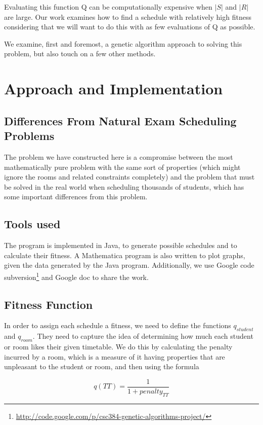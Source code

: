 \documentclass[letterpaper]{article}
\begin{document}
  Evaluating this function Q can be computationally expensive when $|S|$ and $|R|$
  are large. Our work examines how to find a schedule with relatively high fitness
  considering that we will want to do this with as few evaluations of Q as possible.

  We examine, first and foremost, a genetic algorithm approach to solving this problem,
  but also touch on a few other methods.

\section{Approach and Implementation}
  \subsection{Differences From Natural Exam Scheduling Problems}
    The problem we have constructed here is a compromise between the most
    mathematically pure problem with the same sort of properties (which might ignore the
    rooms and related constraints completely) and the problem that must be solved in the
    real world when scheduling thousands of students, which has some important differences
    from this problem.
    
  \subsection{Tools used}
    The program is implemented in Java, to generate possible schedules and to calculate
    their fitness. A Mathematica program is also written to plot graphs, given the data
    generated by the Java program. Additionally, we use Google code 
    subversion\footnote{\url{http://code.google.com/p/csc384-genetic-algorithms-project/}}
    and Google doc to share the work.
    
  \subsection{Fitness Function}
    In order to assign each schedule a fitness, we need to define the functions 
    $q_{student}$ and $q_{room}$. They need to capture the idea of determining how
    much each student or room likes their given timetable. We do this by calculating 
    the penalty incurred by a room, which is a measure of it having properties that 
    are unpleasant to the student or room, and then using the formula
    
    \[ q(TT)=\frac{1}{1+penalty_{TT}} \]
    
\end{document}
